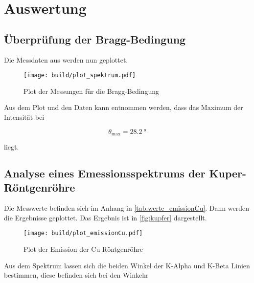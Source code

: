 \section{Auswertung}
\label{sec:Auswertung}



\subsection{Überprüfung der Bragg-Bedingung}
\label{ssec:1}

Die Messdaten aus \label{tab:bragg} werden nun geplottet.

\begin{figure}
    \centering
    \texttt{[image: build/plot\_spektrum.pdf]}
    \caption{Plot der Messungen für die Bragg-Bedingung}
    \label{fig:bragg}
\end{figure}

Aus dem Plot und den Daten kann entnommen werden, dass das Maximum der Intensität bei 

\begin{equation}
    \theta _\text{max} = \SI{28.2}{\degree}
\end{equation}

liegt.

\subsection{Analyse eines Emessionsspektrums der Kuper-Röntgenröhre}
\label{ssec:2}

Die Messwerte befinden sich im Anhang in \autoref{tab:werte_emissionCu}.
Dann werden die Ergebnisse geplottet.
Das Ergebnis ist in \autoref{fig:kupfer} dargestellt.

\begin{figure}
    \centering
    \texttt{[image: build/plot\_emissionCu.pdf]}
    \caption{Plot der Emission der Cu-Röntgenröhre}
    \label{fig:kupfer}
\end{figure}

Aus dem Spektrum lassen sich die beiden Winkel der K-Alpha und K-Beta Linien bestimmen, diese befinden sich bei den Winkeln

